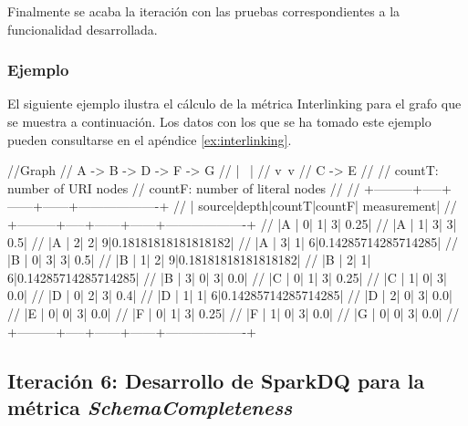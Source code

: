 Finalmente se acaba la iteración con las pruebas correspondientes a la
funcionalidad desarrollada. 

\subsubsection{Ejemplo}

El siguiente ejemplo ilustra el cálculo de la métrica Interlinking para el
grafo que se muestra a continuación. Los datos con los que se ha tomado este
ejemplo pueden consultarse en el apéndice \ref{ex:interlinking}.

\begin{listing}[
  language = scala,
  numbers=left,
  numberstyle=\tiny,
  stepnumber=5,
  numbersep=5pt,
  frame=single,
  caption  = {SparkDQ: Interlinking. Ilustración.},
  label    = code:sparkdq.inter.ilus]


//Graph
//    A -> B -> D -> F -> G
//         | \  |
//         v  \,v
//         C -> E
//
// countT: number of URI nodes
// countF: number of literal nodes
//
//      +---------+-----+------+------+-------------------+
//      |   source|depth|countT|countF|        measurement|
//      +---------+-----+------+------+-------------------+
//      |A        |    0|     1|     3|               0.25|
//      |A        |    1|     3|     3|                0.5|
//      |A        |    2|     2|     9|0.18181818181818182|
//      |A        |    3|     1|     6|0.14285714285714285|
//      |B        |    0|     3|     3|                0.5|
//      |B        |    1|     2|     9|0.18181818181818182|
//      |B        |    2|     1|     6|0.14285714285714285|
//      |B        |    3|     0|     3|                0.0|
//      |C        |    0|     1|     3|               0.25|
//      |C        |    1|     0|     3|                0.0|
//      |D        |    0|     2|     3|                0.4|
//      |D        |    1|     1|     6|0.14285714285714285|
//      |D        |    2|     0|     3|                0.0|
//      |E        |    0|     0|     3|                0.0|
//      |F        |    0|     1|     3|               0.25|
//      |F        |    1|     0|     3|                0.0|
//      |G        |    0|     0|     3|                0.0|
//      +---------+-----+------+------+-------------------+

\end{listing}
\subsection{Iteración 6: Desarrollo de SparkDQ para la métrica
  \textit{SchemaCompleteness}}

